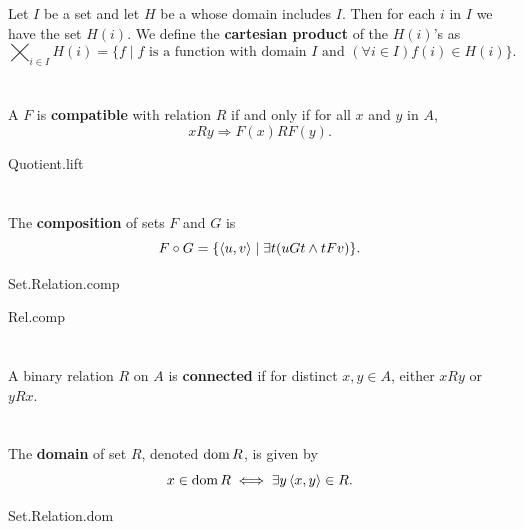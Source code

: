 \documentclass{report}
\begin{document}
  Let $I$ be a set and let $H$ be a  whose domain includes
    $I$.
  Then for each $i$ in $I$ we have the set $H(i)$.
  We define the \textbf{cartesian product} of the $H(i)$'s as
    $$\bigtimes_{i \in I} H(i) = \{f \mid
      f \text{ is a function with domain } I \text{ and }
        (\forall i \in I) f(i) \in H(i)\}.$$


\section{}%

  A  $F$ is \textbf{compatible} with relation $R$ if and
    only if for all $x$ and $y$ in $A$,
    $$xRy \Rightarrow F(x)RF(y).$$

    {Quotient.lift}

\section{}%

  The \textbf{composition} of sets $F$ and $G$ is
    $$F \circ G = \{\left< u, v \right> \mid \exists t(uGt \land tFv)\}.$$

    {Set.Relation.comp}

    {Rel.comp}

\section{}%

  A binary relation $R$ on $A$ is \textbf{connected} if for distinct
    $x, y \in A$, either $xRy$ or $yRx$.


\section{}%

  The \textbf{domain} of set $R$, denoted $\mathop{\text{dom}}{R}$, is given by
    $$x \in \mathop{\text{dom}}{R} \iff \exists y \left< x, y \right> \in R.$$

    {Set.Relation.dom}
\end{document}
